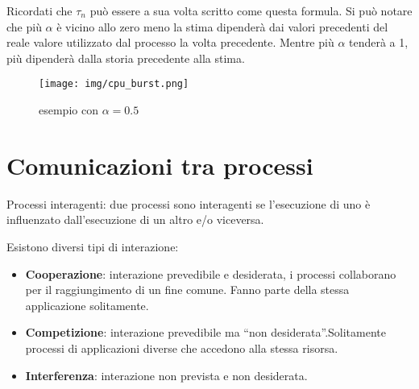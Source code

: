 \documentclass{article}
\begin{document}
\noindent Ricordati che $\tau_n$ può essere a sua volta scritto come questa formula. 
Si può notare che più $\alpha$ è vicino allo zero meno la stima dipenderà dai valori
precedenti del reale valore utilizzato dal processo la volta precedente. Mentre 
più $\alpha$ tenderà a 1, più dipenderà dalla storia precedente alla stima.


\begin{figure}[h!]
    \begin{center}
        \texttt{[image: img/cpu\_burst.png]}  
        \caption{esempio con $\alpha = 0.5$}
    \end{center}
\end{figure}

\pagebreak

\section{Comunicazioni tra processi}
Processi interagenti: due processi sono interagenti se l'esecuzione
di uno è influenzato dall'esecuzione di un altro e/o viceversa. 

\noindent Esistono diversi tipi di interazione:
\begin{itemize}
    \item \textbf{Cooperazione}: interazione prevedibile e desiderata,
    i processi collaborano per il raggiungimento di un fine comune.
    Fanno parte della stessa applicazione solitamente.
    \item \textbf{Competizione}: interazione prevedibile ma 
    “non desiderata”.Solitamente processi di applicazioni diverse 
    che accedono alla stessa risorsa.
    \item \textbf{Interferenza}: interazione non prevista e non
    desiderata.
\end{itemize}
\end{document}
